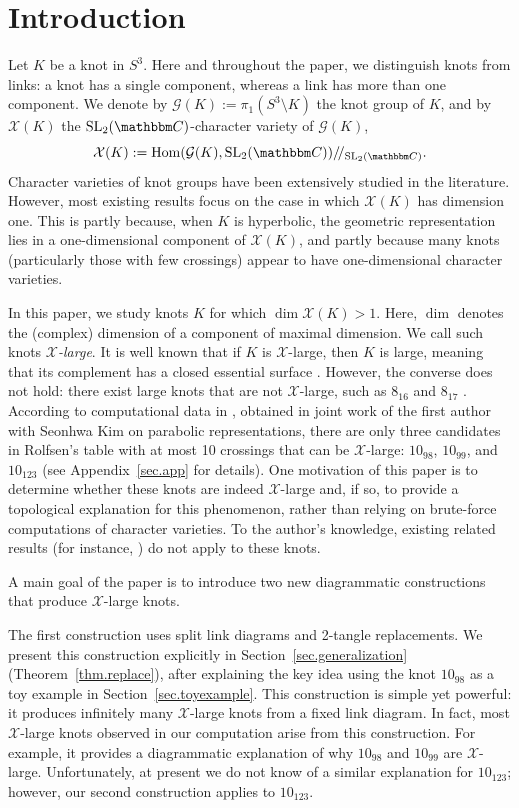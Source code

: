 \documentclass[12pt,reqno]{amsart}
\theoremstyle{definition}
\def\BC{\mathbbm C}
\def\calG{\mathcal G}
\def\calX{\mathcal X}
\def\SL{\mathrm{SL}}
\begin{document}
\section{Introduction}

Let $K$ be a knot in $S^3$. Here and throughout the paper, we distinguish knots from links: a knot has a single component, whereas a link has more than one component. We denote by $\calG(K):=\pi_1(S^3 \setminus K)$ the knot group of $K$, and by $\calX(K)$ the $\SL_2(\BC)$-character variety of $\calG(K)$,
$$\calX(K) := \mathrm{Hom}(\calG(K), \SL_2(\BC))/\!/_{\SL_2(\BC)}.$$
Character varieties of knot groups have been extensively studied in the literature. However, most existing results focus on the case in which $\calX(K)$ has dimension one. This is partly because, when $K$ is hyperbolic, the geometric representation lies in a one-dimensional component of $\calX(K)$, and partly because many knots (particularly those with few crossings) appear to have one-dimensional character varieties.

In this paper, we study knots $K$ for which $\dim \calX(K)>1$. Here, $\dim$ denotes the (complex) dimension of a component of maximal dimension. We call such knots \emph{$\calX$-large}. It is well known that if $K$ is $\calX$-large, then $K$ is large, meaning that its complement has a closed essential surface \cite{cooper1994plane}. However, the converse does not hold: there exist large knots that are not $\calX$-large, such as $8_{16}$ and $8_{17}$ \cite{knotinfo}. According to computational data in \cite{diagramsite}, obtained in joint work of the first author with Seonhwa Kim on parabolic representations, there are only three candidates in Rolfsen’s table with at most 10 crossings that can be $\mathcal{X}$-large: $10_{98}$, $10_{99}$, and $10_{123}$ (see Appendix~\ref{sec.app} for details). One motivation of this paper is to determine whether these knots are indeed $\calX$-large and, if so, to provide a topological explanation for this phenomenon, rather than relying on brute-force computations of character varieties. To the author’s knowledge, existing related results (for instance, \cite{cooper1996remarks, paoluzzi2013non,chen2025high}) do not apply to these knots.


A main goal of the paper is to introduce two new diagrammatic constructions that produce ${\calX}$-large knots. 

The first construction uses split link diagrams and 2-tangle replacements. We present this construction explicitly in Section~\ref{sec.generalization} (Theorem~\ref{thm.replace}), after explaining the key idea using the knot $10_{98}$ as a toy example in Section~\ref{sec.toyexample}. This construction is simple yet powerful: it produces infinitely many $\calX$-large knots from a fixed link diagram. In fact, most $\calX$-large knots observed in our computation arise from this construction. For example, it provides a diagrammatic explanation of why $10_{98}$ and $10_{99}$ are $\mathcal{X}$-large.
Unfortunately, at present we do not know of a similar explanation for $10_{123}$; however, our second construction applies to $10_{123}$.
\end{document}
